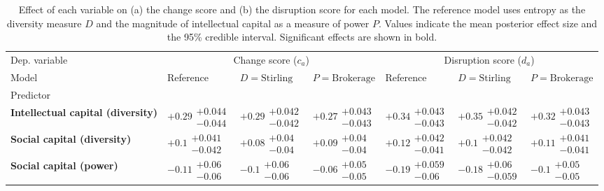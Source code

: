 \begin{table}[H]
\caption{Effect of each variable on (a) the change score and (b) the disruption score for each model. The reference model uses entropy as the diversity measure $D$ and the magnitude of intellectual capital as a measure of power $P$. Values indicate the mean posterior effect size and the 95\% credible interval. Significant effects are shown in bold.}
\label{table:summary_change_disruption}
\renewcommand{\arraystretch}{2}\fontsize{6}{7}\selectfont\begin{tabular}{lllllll}
\toprule
Dep. variable & \multicolumn{3}{c}{Change score ($c_a$)} & \multicolumn{3}{c}{Disruption score ($d_a$)} \\
Model & Reference & $D=\text{Stirling}$ & $P=\text{Brokerage}$ & Reference & $D=\text{Stirling}$ & $P=\text{Brokerage}$ \\
Predictor &  &  &  &  &  &  \\
\midrule
\textbf{Intellectual capital (diversity)} & $\bm{+0.29}\substack{+0.044 \\ -0.044}$ & $\bm{+0.29}\substack{+0.042 \\ -0.042}$ & $\bm{+0.27}\substack{+0.043 \\ -0.043}$ & $\bm{+0.34}\substack{+0.043 \\ -0.043}$ & $\bm{+0.35}\substack{+0.042 \\ -0.042}$ & $\bm{+0.32}\substack{+0.043 \\ -0.043}$ \\
\textbf{Social capital (diversity)} & $\bm{+0.1}\substack{+0.041 \\ -0.042}$ & $\bm{+0.08}\substack{+0.04 \\ -0.04}$ & $\bm{+0.09}\substack{+0.04 \\ -0.04}$ & $\bm{+0.12}\substack{+0.042 \\ -0.041}$ & $\bm{+0.1}\substack{+0.042 \\ -0.042}$ & $\bm{+0.11}\substack{+0.041 \\ -0.041}$ \\
\textbf{Social capital (power)} & $\bm{-0.11}\substack{+0.06 \\ -0.06}$ & $\bm{-0.1}\substack{+0.06 \\ -0.06}$ & $\bm{-0.06}\substack{+0.05 \\ -0.05}$ & $\bm{-0.19}\substack{+0.059 \\ -0.06}$ & $\bm{-0.18}\substack{+0.06 \\ -0.059}$ & $\bm{-0.1}\substack{+0.05 \\ -0.05}$ \\

\end{tabular}
\end{table}
